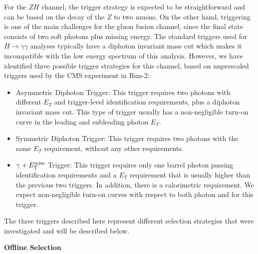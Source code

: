For the $ZH$ channel, the trigger strategy is expected to be straightforward and can be based on the decay of the $Z$ to two muons.
%
%
On the other hand, triggering is one of the main challenges for the gluon fusion channel, since the final state consists of two soft photons plus missing energy. The standard triggers used for $H\rightarrow\gamma\gamma$ analyses typically have a diphoton invariant mass cut which makes it incompatible with the low energy spectrum of this analysis. However, we have identified three possible trigger strategies for this channel, based on  unprescaled triggers used by the CMS experiment in Run-2:

\begin{itemize}
\item Asymmetric Diphoton Trigger: This trigger requires two photons with different $E_{T}$ and trigger-level identification requirements, plus a diphoton invariant mass cut. This type of trigger usually has a non-negligible turn-on curve in the leading and subleading photon  $E_{T}$.
\item Symmetric Diphoton Trigger: This trigger requires two photons with the same $E_{T}$ requirement, without any other requirements.
\item $\gamma+E_{\mathrm{T}}^{\text{miss}}$ Trigger: This trigger requires only one barrel photon passing identification requirements and a $E_{T}$ requirement that is usually higher than the previous two triggers. In addition, there is a calorimetric \MET requirement. We expect non-negligible turn-on curves with respect to both photon and \MET for this trigger.
\end{itemize}

The three triggers described here represent different selection strategies that were investigated and will be described below.


\vspace{0.2cm} \textbf{Offline Selection}

